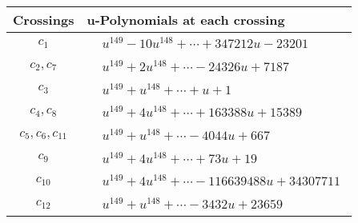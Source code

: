 \documentclass[1p]{elsarticle_modified}
\theoremstyle{definition}
\begin{document}
\begin{tabular}{m{50pt}|m{274pt}}
Crossings & \hspace{64pt}u-Polynomials at each crossing \\
\hline $$\begin{aligned}c_{1}\end{aligned}$$&$\begin{aligned}
&u^{149}-10 u^{148}+\cdots+347212 u-23201
\end{aligned}$\\
\hline $$\begin{aligned}c_{2},c_{7}\end{aligned}$$&$\begin{aligned}
&u^{149}+2 u^{148}+\cdots-24326 u+7187
\end{aligned}$\\
\hline $$\begin{aligned}c_{3}\end{aligned}$$&$\begin{aligned}
&u^{149}+u^{148}+\cdots+u+1
\end{aligned}$\\
\hline $$\begin{aligned}c_{4},c_{8}\end{aligned}$$&$\begin{aligned}
&u^{149}+4 u^{148}+\cdots+163388 u+15389
\end{aligned}$\\
\hline $$\begin{aligned}c_{5},c_{6},c_{11}\end{aligned}$$&$\begin{aligned}
&u^{149}+u^{148}+\cdots-4044 u+667
\end{aligned}$\\
\hline $$\begin{aligned}c_{9}\end{aligned}$$&$\begin{aligned}
&u^{149}+4 u^{148}+\cdots+73 u+19
\end{aligned}$\\
\hline $$\begin{aligned}c_{10}\end{aligned}$$&$\begin{aligned}
&u^{149}+4 u^{148}+\cdots-116639488 u+34307711
\end{aligned}$\\
\hline $$\begin{aligned}c_{12}\end{aligned}$$&$\begin{aligned}
&u^{149}+u^{148}+\cdots-3432 u+23659
\end{aligned}$\\
\hline
\end{tabular}\\~\\
\end{document}
